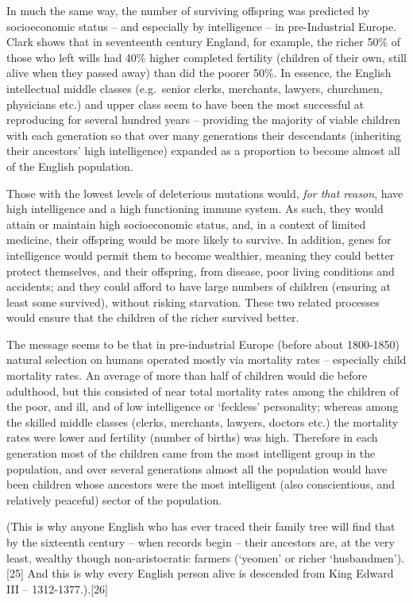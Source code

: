 \documentclass[
]{book}
\begin{document}
In much the same way, the number of surviving offspring was predicted by socioeconomic status -- and especially by intelligence -- in pre-Industrial Europe. Clark shows that in seventeenth century England, for example, the richer 50\% of those who left wills had 40\% higher completed fertility (children of their own, still alive when they passed away) than did the poorer 50\%. In essence, the English intellectual middle classes (e.g.~senior clerks, merchants, lawyers, churchmen, physicians etc.) and upper class seem to have been the most successful at reproducing for several hundred years -- providing the majority of viable children with each generation so that over many generations their descendants (inheriting their ancestors' high intelligence) expanded as a proportion to become almost all of the English population.

Those with the lowest levels of deleterious mutations would, \emph{for that reason}, have high intelligence and a high functioning immune system. As such, they would attain or maintain high socioeconomic status, and, in a context of limited medicine, their offspring would be more likely to survive. In addition, genes for intelligence would permit them to become wealthier, meaning they could better protect themselves, and their offspring, from disease, poor living conditions and accidents; and they could afford to have large numbers of children (ensuring at least some survived), without risking starvation. These two related processes would ensure that the children of the richer survived better.

The message seems to be that in pre-industrial Europe (before about 1800-1850) natural selection on humans operated mostly via mortality rates -- especially child mortality rates. An average of more than half of children would die before adulthood, but this consisted of near total mortality rates among the children of the poor, and ill, and of low intelligence or `feckless' personality; whereas among the skilled middle classes (clerks, merchants, lawyers, doctors etc.) the mortality rates were lower and fertility (number of births) was high. Therefore in each generation most of the children came from the most intelligent group in the population, and over several generations almost all the population would have been children whose ancestors were the most intelligent (also conscientious, and relatively peaceful) sector of the population.

(This is why anyone English who has ever traced their family tree will find that by the sixteenth century -- when records begin -- their ancestors are, at the very least, wealthy though non-aristocratic farmers (`yeomen' or richer `husbandmen').{[}25{]} And this is why every English person alive is descended from King Edward III -- 1312-1377.).{[}26{]}
\end{document}
